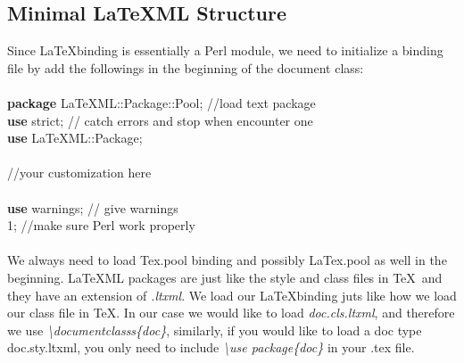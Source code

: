 \documentclass{book}
\begin{document}
\subsection{Minimal LaTeXML Structure}
Since \LaTeX binding is essentially a Perl module, we need to initialize a binding file by add the followings in the beginning of the document class:\\ \\
\textbf{package} LaTeXML::Package::Pool; //load text package \\
\textbf{use} strict; // catch errors and stop when encounter one\\
\textbf{use} LaTeXML::Package;\\ \\
//your customization here \\ \\
\textbf{use} warnings; // give warnings\\
1; //make sure Perl work properly \\ \\
We always need to load Tex.pool binding and possibly LaTex.pool as well in the beginning. \LaTeX ML packages are just like the 
style and class files in \TeX\  and they have an extension of \emph{.ltxml}. We load our \LaTeX binding juts like how we load our 
class file in \TeX . In our case we would like to load \emph{doc.cls.ltxml}, and therefore we use \emph{\textbackslash documentclasss\{doc\}},
similarly, if you would like to load a doc type doc.sty.ltxml, you only need to include \emph{\textbackslash use package\{doc\}} in your .tex 
file.
\end{document}
